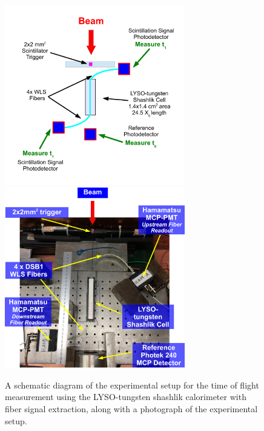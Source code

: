 \begin{figure}[H] \centering
\includegraphics[width=0.7\textwidth]{figs/timing/ShashlikFiberSetupSchematic} \\
\includegraphics[width=0.7\textwidth]{figs/timing/ShashlikFiberSetupPhoto} 
\caption{ A schematic diagram of the experimental setup for the
time of flight measurement using the LYSO-tungsten shashlik calorimeter
with fiber signal extraction, along with a photograph of the
experimental setup. } 
\label{fig:ShashlikFiberSetup}
\end{figure}

